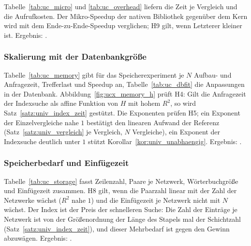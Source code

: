 Tabelle~\ref{tab:uc_micro} und \ref{tab:uc_overhead} liefern die Zeit je Vergleich und die Aufrufkosten. Der Mikro-Speedup der nativen Bibliothek gegenüber dem Kern wird mit dem Ende-zu-Ende-Speedup verglichen; H9 gilt, wenn Letzterer kleiner ist. Ergebnis: .

\subsubsection{Skalierung mit der Datenbankgröße}


Tabelle~\ref{tab:uc_memory} gibt für das Speicherexperiment je $N$ Aufbau- und Anfragezeit, Trefferlast und Speedup an, Tabelle~\ref{tab:uc_dbfit} die Anpassungen in der Datenbank. Abbildung~\ref{fig:ucx_memory_h} prüft H4: Gilt die Anfragezeit der Indexsuche als affine Funktion von $H$ mit hohem $R^2$, so wird Satz~\ref{satz:univ_index_zeit} gestützt. Die Exponenten prüfen H5; ein Exponent der Einzelvergleiche nahe $1$ bestätigt den linearen Aufwand der Referenz (Satz~\ref{satz:univ_vergleich} je Vergleich, $N$ Vergleiche), ein Exponent der Indexsuche deutlich unter $1$ stützt Korollar~\ref{kor:univ_unabhaengig}. Ergebnis: .

\subsubsection{Speicherbedarf und Einfügezeit}


Tabelle~\ref{tab:uc_storage} fasst Zeilenzahl, Paare je Netzwerk, Wörterbuchgröße und Einfügezeit zusammen. H8 gilt, wenn die Paarzahl linear mit der Zahl der Netzwerke wächst ($R^2$ nahe $1$) und die Einfügezeit je Netzwerk nicht mit $N$ wächst. Der Index ist der Preis der schnelleren Suche: Die Zahl der Einträge je Netzwerk ist von der Größenordnung der Länge des Stapels mal der Schichtzahl (Satz~\ref{satz:univ_index_zeit}), und dieser Mehrbedarf ist gegen den Gewinn abzuwägen. Ergebnis: .

